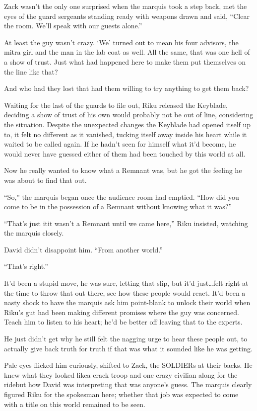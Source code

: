 Zack wasn't the only one surprised when the marquis took a step back, met the eyes of the guard sergeants standing ready with weapons drawn and said, ``Clear the room. We'll speak with our guests alone.''

At least the guy wasn't crazy. `We' turned out to mean his four advisors, the mitra girl and the man in the lab coat as well. All the same, that was one hell of a show of trust. Just what had happened here to make them put themselves on the line like that?

And who had they lost that had them willing to try anything to get them back?


\scenechange


Waiting for the last of the guards to file out, Riku released the Keyblade, deciding a show of trust of his own would probably not be out of line, considering the situation. Despite the unexpected changes the Keyblade had opened itself up to, it felt no different as it vanished, tucking itself away inside his heart while it waited to be called again. If he hadn't seen for himself what it'd become, he would never have guessed either of them had been touched by this world at all.

Now he really wanted to know what a Remnant was, but he got the feeling he was about to find that out.

``So,'' the marquis began once the audience room had emptied. ``How did you come to be in the possession of a Remnant without knowing what it was?''

``That's just it\textemdash it wasn't a Remnant until we came here,'' Riku insisted, watching the marquis closely.

David didn't disappoint him. ``From another world.''

``That's right.''

It'd been a stupid move, he was sure, letting that slip, but it'd just\ldots felt right at the time to throw that out there, see how these people would react. It'd been a nasty shock to have the marquis ask him point-blank to unlock their world when Riku's gut had been making different promises where the guy was concerned. Teach him to listen to his heart; he'd be better off leaving that to the experts.

He just didn't get why he still felt the nagging urge to hear these people out, to actually give back truth for truth if that was what it sounded like he was getting.

Pale eyes flicked him curiously, shifted to Zack, the SOLDIERs at their backs. He knew what they looked like\textemdash a crack troop and one crazy civilian along for the ride\textemdash but how David was interpreting that was anyone's guess. The marquis clearly figured Riku for the spokesman here; whether that job was expected to come with a title on this world remained to be seen.

